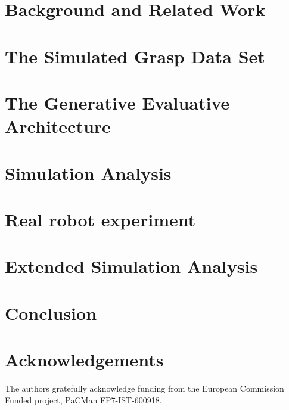 \documentclass{ws-ijhr}
\begin{document}
\section{Background and Related Work}



\section{The Simulated Grasp Data Set}
\label{section:simulation}


\section{The Generative Evaluative Architecture} \label{section:evaluative}


\section{Simulation Analysis}
\label{section:simulationAnalysis}


\section{Real robot experiment}
\label{section:experiments}


\section{Extended Simulation Analysis}
\label{section:extendedSimulationAnalysis}


\section{Conclusion} 
\label{sec:conclusion}


\section*{Acknowledgements}

The authors gratefully acknowledge funding from the European Commission Funded project, PaCMan FP7-IST-600918.
\end{document}
